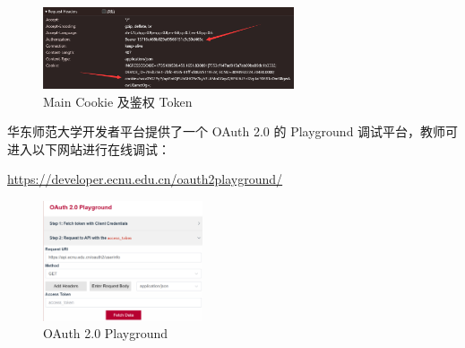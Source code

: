 \begin{figure}[H]
    \centering
    \includegraphics[width=0.66\textwidth]{img/main_cache.png}
    \caption{Main Cookie 及鉴权 Token}
    \label{fig:main_cache}
\end{figure}

华东师范大学开发者平台提供了一个 OAuth 2.0 的 Playground 调试平台，教师可进入以下网站进行在线调试：

\href{https://developer.ecnu.edu.cn/oauth2playground/}{\underline{https://developer.ecnu.edu.cn/oauth2playground/}}

\begin{figure}[H]
    \centering
    \includegraphics[width=0.42\textwidth]{img/OAuth2Playground.png}
    \caption{OAuth 2.0 Playground}
    \label{fig:oauth2_playground}
\end{figure}